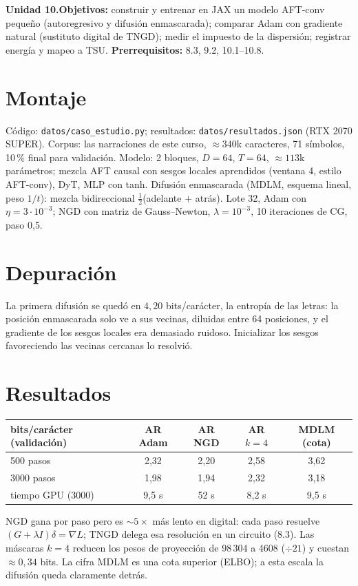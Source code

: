 \documentclass[11pt,a4paper]{article}
\begin{document}

\noindent\textbf{Unidad 10.}\quad\textbf{Objetivos:} construir y entrenar en JAX un modelo AFT-conv pequeño (autoregresivo y difusión enmascarada); comparar Adam con
gradiente natural (sustituto digital de TNGD); medir el impuesto de la dispersión; registrar energía y mapeo a TSU.
\textbf{Prerrequisitos:} 8.3, 9.2, 10.1--10.8.

\section{Montaje}
Código: \texttt{datos/caso\_estudio.py}; resultados: \texttt{datos/resultados.json} (RTX 2070 SUPER). Corpus: las narraciones de este curso, $\approx340$k caracteres, 71
símbolos, 10\,\% final para validación. Modelo: 2 bloques, $D=64$, $T=64$, $\approx113$k parámetros; mezcla AFT causal con sesgos locales aprendidos (ventana 4, estilo
AFT-conv), DyT, MLP con tanh. Difusión enmascarada (MDLM, esquema lineal, peso $1/t$): mezcla bidireccional $\tfrac12$(adelante $+$ atrás). Lote 32, Adam con
$\eta=3\cdot10^{-3}$; NGD con matriz de Gauss--Newton, $\lambda=10^{-3}$, 10 iteraciones de CG, paso 0{,}5.

\section{Depuración}
La primera difusión se quedó en $4{,}20$ bits/carácter, la entropía de las letras: la posición enmascarada solo ve a sus vecinas, diluidas entre 64 posiciones, y el gradiente
de los sesgos locales era demasiado ruidoso. Inicializar los sesgos favoreciendo las vecinas cercanas lo resolvió.

\section{Resultados \evS}
\begin{center}\small\begin{tabular}{lcccc}\toprule
bits/carácter (validación) & AR Adam & AR NGD & AR $k=4$ & MDLM (cota)\\\midrule
500 pasos & 2{,}32 & 2{,}20 & 2{,}58 & 3{,}62\\ 3000 pasos & 1{,}98 & 1{,}94 & 2{,}32 & 3{,}18\\
tiempo GPU (3000) & 9{,}5 s & 52 s & 8{,}2 s & 9{,}5 s\\\bottomrule
\end{tabular}\end{center}
NGD gana por paso pero es $\sim5\times$ más lento en digital: cada paso resuelve $(G+\lambda I)\delta=\nabla L$; TNGD delega esa resolución en un circuito (8.3). Las máscaras
$k=4$ reducen los pesos de proyección de 98\,304 a 4608 ($\div21$) y cuestan $\approx0{,}34$ bits. La cifra MDLM es una cota superior (ELBO); a esta escala la difusión queda
claramente detrás.
\end{document}
